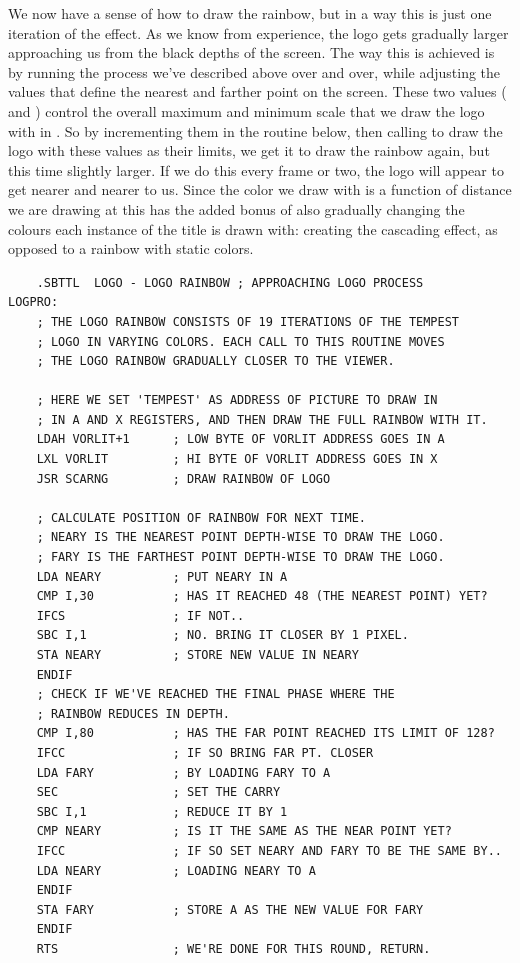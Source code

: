 We now have a sense of how to draw the rainbow, but in a way this is just one iteration
of the effect. As we know from experience, the logo gets gradually larger approaching
us from the black depths of the screen. The way this is achieved is by running the 
process we've described above over and over, while adjusting the values that define
the nearest and farther point on the screen. These two values ( and ) control the overall 
maximum and minimum scale that we draw the logo with in . So by
incrementing them in the routine  below, then calling  to
draw the logo with these values as their limits, we get it to draw the rainbow again, but 
this time slightly larger. If we do this every frame or two, the logo will appear to get nearer
and nearer to us.  Since the color we draw with is a function of distance we are drawing at this
has the added bonus of also gradually changing the colours each instance of the title is drawn with:
creating the cascading effect, as opposed to a rainbow with static colors.

\begin{lstlisting}
    .SBTTL  LOGO - LOGO RAINBOW ; APPROACHING LOGO PROCESS
LOGPRO: 
    ; THE LOGO RAINBOW CONSISTS OF 19 ITERATIONS OF THE TEMPEST
    ; LOGO IN VARYING COLORS. EACH CALL TO THIS ROUTINE MOVES
    ; THE LOGO RAINBOW GRADUALLY CLOSER TO THE VIEWER.

    ; HERE WE SET 'TEMPEST' AS ADDRESS OF PICTURE TO DRAW IN 
    ; IN A AND X REGISTERS, AND THEN DRAW THE FULL RAINBOW WITH IT.
    LDAH VORLIT+1      ; LOW BYTE OF VORLIT ADDRESS GOES IN A
    LXL VORLIT         ; HI BYTE OF VORLIT ADDRESS GOES IN X
    JSR SCARNG         ; DRAW RAINBOW OF LOGO

    ; CALCULATE POSITION OF RAINBOW FOR NEXT TIME.
    ; NEARY IS THE NEAREST POINT DEPTH-WISE TO DRAW THE LOGO.
    ; FARY IS THE FARTHEST POINT DEPTH-WISE TO DRAW THE LOGO.
    LDA NEARY          ; PUT NEARY IN A
    CMP I,30           ; HAS IT REACHED 48 (THE NEAREST POINT) YET?
    IFCS               ; IF NOT..
    SBC I,1            ; NO. BRING IT CLOSER BY 1 PIXEL.
    STA NEARY          ; STORE NEW VALUE IN NEARY
    ENDIF
    ; CHECK IF WE'VE REACHED THE FINAL PHASE WHERE THE
    ; RAINBOW REDUCES IN DEPTH.
    CMP I,80           ; HAS THE FAR POINT REACHED ITS LIMIT OF 128?
    IFCC               ; IF SO BRING FAR PT. CLOSER
    LDA FARY           ; BY LOADING FARY TO A
    SEC                ; SET THE CARRY
    SBC I,1            ; REDUCE IT BY 1
    CMP NEARY          ; IS IT THE SAME AS THE NEAR POINT YET?
    IFCC               ; IF SO SET NEARY AND FARY TO BE THE SAME BY..
    LDA NEARY          ; LOADING NEARY TO A
    ENDIF
    STA FARY           ; STORE A AS THE NEW VALUE FOR FARY
    ENDIF
    RTS                ; WE'RE DONE FOR THIS ROUND, RETURN.
\end{lstlisting}

